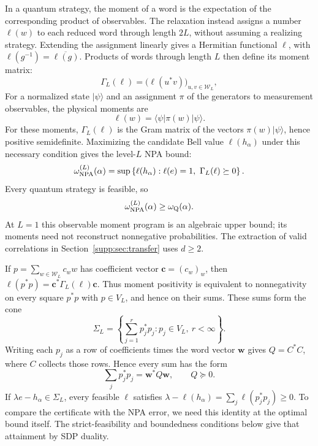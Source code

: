 \documentclass[aps,prl,onecolumn,10pt,superscriptaddress,nofootinbib,longbibliography]{revtex4-2}
\theoremstyle{remark}
\begin{document}
In a quantum strategy, the moment of a word is the expectation of the corresponding product of observables. The relaxation instead assigns a number $\ell(w)$ to each reduced word through length $2L$, without assuming a realizing strategy. Extending the assignment linearly gives a Hermitian functional $\ell$, with $\ell(g^{-1})=\overline{\ell(g)}$. Products of words through length $L$ then define its moment matrix:
\begin{equation}
\Gamma_L(\ell)=\bigl(\ell(u^*v)\bigr)_{u,v\in\mathcal W_L},
\label{supp:eq:moment-matrix}
\end{equation}
For a normalized state $|\psi\rangle$ and an assignment $\pi$ of the generators to measurement observables, the physical moments are
\begin{equation}
\ell(w)=\langle\psi|\pi(w)|\psi\rangle.
\label{supp:eq:quantum-functional}
\end{equation}
For these moments, $\Gamma_L(\ell)$ is the Gram matrix of the vectors $\pi(w)|\psi\rangle$, hence positive semidefinite. Maximizing the candidate Bell value $\ell(h_\alpha)$ under this necessary condition gives the level-$L$ NPA bound:
\begin{equation}
\omega_{\rm NPA}^{(L)}(\alpha)=
\sup\left\{\ell(h_\alpha):\ell(e)=1,\ \Gamma_L(\ell)\succeq0\right\}.
\label{supp:eq:primal-NPA}
\end{equation}
Every quantum strategy is feasible, so
\begin{equation}
\omega_{\rm NPA}^{(L)}(\alpha)\geq\omega_{\rm Q}(\alpha).
\label{supp:eq:outer-bound}
\end{equation}
At $L=1$ this observable moment program is an algebraic upper bound; its moments need not reconstruct nonnegative probabilities. The extraction of valid correlations in Section~\ref{supp:sec:transfer} uses $d\geq2$.

If $p=\sum_{w\in\mathcal W_L}c_ww$ has coefficient vector $\bm c=(c_w)_w$, then $\ell(p^*p)=\bm c^*\Gamma_L(\ell)\bm c$. Thus moment positivity is equivalent to nonnegativity on every square $p^*p$ with $p\in V_L$, and hence on their sums. These sums form the cone
\begin{equation}
\Sigma_L=
\left\{\sum_{j=1}^{r}p_j^*p_j:
p_j\in V_L,\ r<\infty\right\}.
\label{supp:eq:sigma-L}
\end{equation}
Writing each $p_j$ as a row of coefficients times the word vector $\bm w$ gives $Q=C^*C$, where $C$ collects those rows. Hence every sum has the form
\begin{equation}
\sum_jp_j^*p_j=\bm w^*Q\bm w,
\qquad Q\succeq0.
\label{supp:eq:gram-representation}
\end{equation}
If $\lambda e-h_\alpha\in\Sigma_L$, every feasible $\ell$ satisfies $\lambda-\ell(h_\alpha)=\sum_j\ell(p_j^*p_j)\geq0$. To compare the certificate with the NPA error, we need this identity at the optimal bound itself. The strict-feasibility and boundedness conditions below give that attainment by SDP duality.
\end{document}
